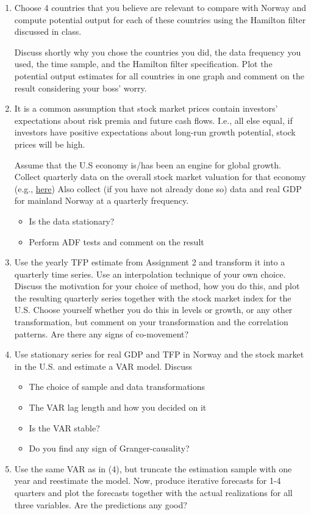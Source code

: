 \documentclass[10pt]{article}
\begin{document}
\begin{enumerate}
    \item Choose 4 countries that you believe are relevant to compare with Norway and compute
    potential output for each of these countries using the Hamilton filter discussed in class.
    
    Discuss shortly why you chose the countries you did, the data frequency you used, the
    time sample, and the Hamilton filter specification. Plot the potential output estimates for
    all countries in one graph and comment on the result considering your boss' worry.
    \item It is a common assumption that stock market prices contain investors' expectations
    about risk premia and future cash flows. I.e., all else equal, if investors have positive
    expectations about long-run growth potential, stock prices will be high.
    
    Assume that the U.S economy is/has been an engine for global growth. Collect quarterly
    data on the overall stock market valuation for that economy (e.g., \href{https://fred.stlouisfed.org/series/SPASTT01USQ661N}{here}) Also collect (if you have not
    already done so) data and real GDP for mainland Norway at a quarterly frequency.
    \begin{itemize}
        \item Is the data stationary?
        \item Perform ADF tests and comment on the result 
    \end{itemize}
    \item Use the yearly TFP estimate from Assignment 2 and transform it into a quarterly time
    series. Use an interpolation technique of your own choice. Discuss the motivation for
    your choice of method, how you do this, and plot the resulting quarterly series together
    with the stock market index for the U.S. Choose yourself whether you do this in levels or
    growth, or any other transformation, but comment on your transformation and the
    correlation patterns. Are there any signs of co-movement?
    \item Use stationary series for real GDP and TFP in Norway and the stock market in the U.S.
    and estimate a VAR model. Discuss
    \begin{itemize}
        \item The choice of sample and data transformations
        \item The VAR lag length and how you decided on it
        \item Is the VAR stable?
        \item Do you find any sign of Granger-causality?
    \end{itemize}
    \newpage 
    \item Use the same VAR as in (4), but truncate the estimation sample with one year and reestimate the model. Now, produce iterative forecasts for 1-4 quarters and plot the
    forecasts together with the actual realizations for all three variables. Are the predictions
    any good?
\end{enumerate}
\end{document}
